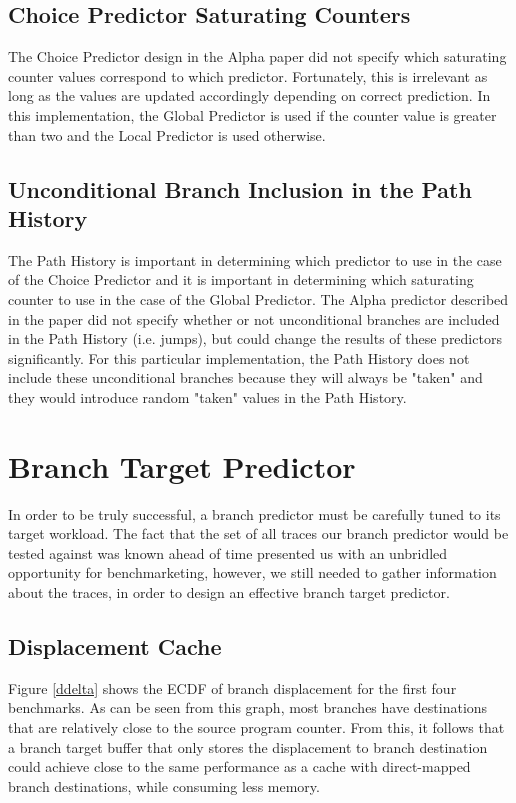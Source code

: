 \documentclass[twocolumn]{article}
\begin{document}
\subsection{Choice Predictor Saturating Counters}
The Choice Predictor design in the Alpha paper did not specify which saturating 
counter values correspond to which predictor. Fortunately, this is irrelevant
as long as the values are updated accordingly depending on correct prediction.
In this implementation, the Global Predictor is used if the counter value is 
greater than two and the Local Predictor is used otherwise.

\subsection{Unconditional Branch Inclusion in the Path History}
The Path History is important in determining which predictor to use
in the case of the Choice Predictor and it is important in determining
which saturating counter to use in the case of the Global Predictor.
The Alpha predictor described in the paper did not specify whether or not
unconditional branches are included in the Path History (i.e. jumps), but
could change the results of these predictors significantly. For this 
particular implementation, the Path History does not include these
unconditional branches because they will always be "taken" and they
would introduce random "taken" values in the Path History. 

\section{Branch Target Predictor} 

In order to be truly successful, a branch predictor must be carefully
tuned to its target workload. The fact that the set of all traces our
branch predictor would be tested against was known ahead of time
presented us with an unbridled opportunity for benchmarketing,
however, we still needed to gather information about the traces, in
order to design an effective branch target predictor. 

\subsection{Displacement Cache}
Figure \ref{ddelta} shows the ECDF of branch displacement for the
first four benchmarks. As can be seen from this graph, most branches
have destinations that are relatively close to the source program
counter. From this, it follows that a branch target buffer that only
stores the displacement to branch destination could achieve close to
the same performance as a cache with direct-mapped branch
destinations, while consuming less memory. 
\end{document}
